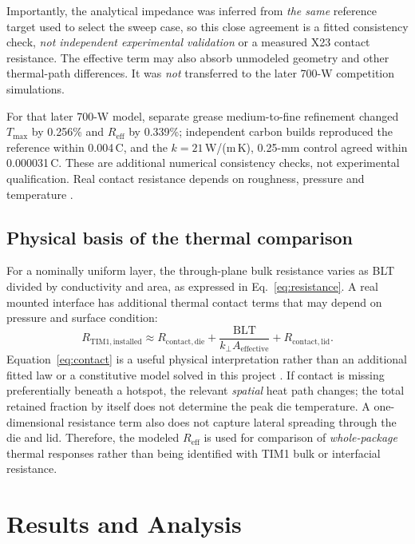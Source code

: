 \documentclass[10pt,a4paper]{article}
\newcommand{\Reff}{R_{\mathrm{eff}}}
\newcommand{\BLT}{\mathrm{BLT}}
\newcommand{\kperp}{k_{\perp}}
\begin{document}
Importantly, the analytical impedance was inferred from \emph{the same}
reference target used to select the sweep case, so this close agreement
is a fitted consistency check, \emph{not independent experimental validation}
or a measured X23 contact resistance. The effective term may also absorb
unmodeled geometry and other thermal-path differences. It was \emph{not}
transferred to the later 700-W competition simulations.

For that later 700-W model, separate grease medium-to-fine refinement changed
$T_{\max}$ by 0.256\% and $\Reff$ by 0.339\%; independent carbon builds
reproduced the reference within 0.004\,\textdegree C, and the
$k=21$\,W/(m\,K), 0.25-mm control agreed within
0.000031\,\textdegree C. These are additional numerical consistency checks,
not experimental qualification. Real contact resistance depends on
roughness, pressure and temperature \citep{zhao2019}.


\subsection{Physical basis of the thermal comparison}
For a nominally uniform layer, the through-plane bulk resistance varies as BLT divided by
conductivity and area, as expressed in Eq.~\eqref{eq:resistance}. A real mounted interface has additional
thermal contact terms that may depend on pressure and surface condition:
\begin{equation}
R_{\mathrm{TIM1,installed}}\approx R_{\mathrm{contact,die}}+
\frac{\BLT}{\kperp A_{\mathrm{effective}}}
+R_{\mathrm{contact,lid}}.
\label{eq:contact}
\end{equation}
Equation~\eqref{eq:contact} is a useful physical interpretation rather than an additional fitted law
or a constitutive model solved in this project \citep{prasher2006,zhao2019,li2023}.
If contact is missing preferentially beneath a hotspot, the relevant \emph{spatial} heat path changes;
the total retained fraction by itself does not determine the peak die temperature.
A one-dimensional resistance term also does not capture lateral spreading through
the die and lid. Therefore, the modeled $\Reff$ is used for comparison of \emph{whole-package}
thermal responses rather than being identified with TIM1 bulk or interfacial resistance.

\section{Results and Analysis}
\end{document}

